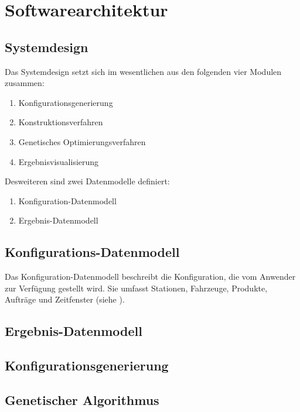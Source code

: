 \section{Softwarearchitektur}

\subsection{Systemdesign}
Das Systemdesign setzt sich im wesentlichen aus den folgenden vier Modulen zusammen:
\begin{enumerate}
 \item Konfigurationsgenerierung
 \item Konstruktionsverfahren
 \item Genetisches Optimierungsverfahren
 \item Ergebnisvisualisierung
\end{enumerate}
Desweiteren sind zwei Datenmodelle definiert:
\begin{enumerate}
 \item Konfiguration-Datenmodell
 \item Ergebnis-Datenmodell
\end{enumerate}

\subsection{Konfigurations-Datenmodell}
Das Konfiguration-Datenmodell beschreibt die Konfiguration, die vom Anwender zur Verfügung gestellt wird. Sie umfasst Stationen, Fahrzeuge, Produkte, Aufträge und Zeitfenster (siehe ).

\subsection{Ergebnis-Datenmodell}

\subsection{Konfigurationsgenerierung}

\subsection{Genetischer Algorithmus}
